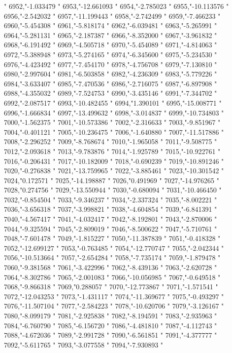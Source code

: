 "
6952,"-1.033479
"
6953,"-12.661093
"
6954,"-2.785023
"
6955,"-10.113576
"
6956,"-2.542032
"
6957,"-11.199443
"
6958,"-2.742499
"
6959,"-7.466233
"
6960,"-5.454308
"
6961,"-5.818174
"
6962,"-6.039481
"
6963,"-5.265991
"
6964,"-5.281131
"
6965,"-2.187387
"
6966,"-8.352000
"
6967,"-3.961832
"
6968,"-6.191492
"
6969,"-4.505718
"
6970,"-5.454089
"
6971,"-4.814063
"
6972,"-5.388948
"
6973,"-5.274165
"
6974,"-6.345600
"
6975,"-5.234530
"
6976,"-4.423492
"
6977,"-7.454170
"
6978,"-4.756708
"
6979,"-7.130810
"
6980,"-2.997604
"
6981,"-6.503858
"
6982,"-4.236309
"
6983,"-5.779226
"
6984,"-3.633407
"
6985,"-7.470536
"
6986,"-2.716075
"
6987,"-6.897908
"
6988,"-4.355032
"
6989,"-7.524753
"
6990,"-3.435146
"
6991,"-7.344702
"
6992,"-2.087517
"
6993,"-10.482455
"
6994,"1.390101
"
6995,"-15.008771
"
6996,"-1.666834
"
6997,"-13.499632
"
6998,"-3.014837
"
6999,"-10.734803
"
7000,"-1.562375
"
7001,"-10.573386
"
7002,"-2.316633
"
7003,"-9.851967
"
7004,"-0.401121
"
7005,"-10.236475
"
7006,"-1.640880
"
7007,"-11.517886
"
7008,"-2.296252
"
7009,"-8.768674
"
7010,"-1.965058
"
7011,"-9.508775
"
7012,"-2.093618
"
7013,"-9.783876
"
7014,"-1.925789
"
7015,"-10.922761
"
7016,"-0.206431
"
7017,"-10.182009
"
7018,"-0.690239
"
7019,"-10.891246
"
7020,"-0.276838
"
7021,"-13.759965
"
7022,"-3.885461
"
7023,"-10.301542
"
7024,"0.172571
"
7025,"-14.198887
"
7026,"0.491969
"
7027,"-14.976265
"
7028,"0.274756
"
7029,"-13.550944
"
7030,"-0.680094
"
7031,"-10.466450
"
7032,"-0.854504
"
7033,"-9.346237
"
7034,"-2.337324
"
7035,"-8.002221
"
7036,"-3.656318
"
7037,"-3.998821
"
7038,"-4.604854
"
7039,"-6.841391
"
7040,"-4.567417
"
7041,"-4.032417
"
7042,"-8.192801
"
7043,"-2.870006
"
7044,"-9.325594
"
7045,"-2.809019
"
7046,"-8.500622
"
7047,"-5.710761
"
7048,"-7.601478
"
7049,"-1.815227
"
7050,"-11.387839
"
7051,"-0.418328
"
7052,"-12.699127
"
7053,"-0.763485
"
7054,"-12.770747
"
7055,"-2.042344
"
7056,"-10.513664
"
7057,"-2.654284
"
7058,"-7.735174
"
7059,"-1.879478
"
7060,"-9.381568
"
7061,"-3.422996
"
7062,"-8.439136
"
7063,"-2.620728
"
7064,"-8.302786
"
7065,"-2.001083
"
7066,"-10.056985
"
7067,"-0.649518
"
7068,"-9.866318
"
7069,"0.288057
"
7070,"-12.773867
"
7071,"-1.571541
"
7072,"-12.043253
"
7073,"-1.431117
"
7074,"-11.369677
"
7075,"-0.493297
"
7076,"-11.507104
"
7077,"-2.584223
"
7078,"-10.620706
"
7079,"-3.126167
"
7080,"-8.099179
"
7081,"-2.925838
"
7082,"-8.194591
"
7083,"-2.935963
"
7084,"-6.760790
"
7085,"-6.156720
"
7086,"-4.481810
"
7087,"-4.112743
"
7088,"-4.672036
"
7089,"-2.991728
"
7090,"-6.561851
"
7091,"-4.377777
"
7092,"-5.611765
"
7093,"-3.077558
"
7094,"-7.930893
"
